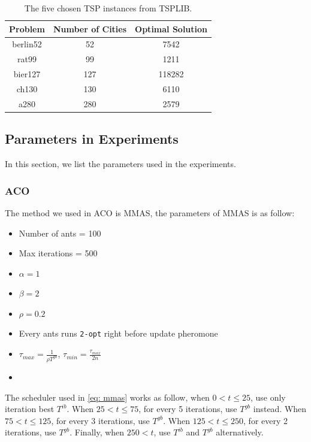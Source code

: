 \documentclass[twocolumn, a4paper]{extarticle}
\begin{document}
\begin{table}[H]
	\caption{The five chosen TSP instances from TSPLIB.}
	\label{tab: tsplib}
	\begin{tabular}{@{}ccc@{}}
		\toprule
		\textbf{Problem} & \textbf{Number of Cities} & \textbf{Optimal Solution} \\ \midrule
		berlin52         & 52                        & 7542                      \\
		rat99            & 99                        & 1211                      \\
		bier127          & 127                       & 118282                    \\
		ch130            & 130                       & 6110                      \\
		a280             & 280                       & 2579                      \\ \bottomrule
	\end{tabular}
\end{table}

\subsection{Parameters in Experiments}

In this section, we list the parameters used in the experiments.

\subsubsection{ACO}

The method we used in ACO is MMAS, the parameters of MMAS is as follow:

\begin{itemize}
	\item Number of ants = 100
	\item Max iterations = 500
	\item $\alpha=1$
	\item $\beta=2$
	\item $\rho=0.2$
	\item Every ants runs \texttt{2-opt} right before update pheromone
	\item $\tau_{max} = \frac{1}{\rho T^{gb}}$, $\tau_{min} = \frac{\tau_{max}}{2n}$
	\item 
\end{itemize}

The scheduler used in \autoref{eq: mmas} works as follow, when $0 < t \leq 25$, use only iteration best $T^{ib}$. When $25 < t \leq 75$, for every 5 iterations, use $T^{gb}$ instead. When $75 < t \leq 125$, for every 3 iterations, use $T^{gb}$. When $125 < t \leq 250$, for every 2 iterations, use $T^{gb}$. Finally, when $250 < t$, use $T^{ib}$ and $T^{gb}$ alternatively.
\end{document}
